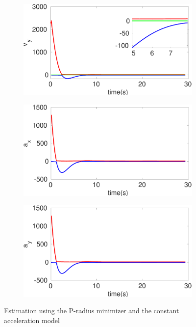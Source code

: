 \begin{figure}[h]
\begin{subfigure}{.5\linewidth}
\end{subfigure}
\begin{subfigure}{.5\linewidth}
\centering
\includegraphics[width=\linewidth]{figures/Prad/s3capradv_y}
\end{subfigure}
\begin{subfigure}{.5\linewidth}
\centering
\includegraphics[width=\linewidth]{figures/Prad/s3caprada_x}
\end{subfigure}
\begin{subfigure}{.5\linewidth}
\centering
\includegraphics[width=\linewidth]{figures/Prad/s3caprada_y}
\end{subfigure}
\caption{Estimation using the P-radius minimizer and the constant acceleration model}
\end{figure}

